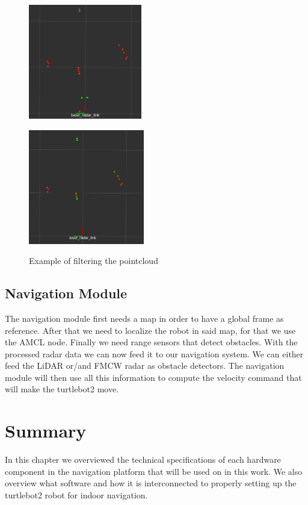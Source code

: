 \begin{figure}[ht!] 
    \begin{minipage}[b]{.49\linewidth}
        \includegraphics[height=5cm,width=\linewidth]{imgs/chapter4/notfilt.png}
        \label{fig:nonfilt}
    \end{minipage}
    \begin{minipage}[b]{.49\linewidth}
        \includegraphics[height=5cm,width=\linewidth]{imgs/chapter4/filt.png}
        \label{fig:filt}
    \end{minipage}
    \caption{Example of filtering the pointcloud}
    \label{fig:filters}
\end{figure}
\subsection{Navigation Module}
The navigation module first needs a map in order to have a global frame as reference. After that we need to localize the robot in said map, for that we use the \ac{AMCL} node. Finally we need range sensors that detect obstacles.
With the processed \ac{radar} data we can now feed it to our navigation system. We can either feed the \ac{LiDAR} or/and \ac{FMCW} \ac{radar} as obstacle detectors. 
The navigation module will then use all this information to compute the velocity command  that will make the turtlebot2 move.


\section{Summary}
In this chapter we overviewed the technical specifications of each hardware component in the navigation platform that will be used on in this work. We also overview what software and how it is interconnected  to properly setting up the turtlebot2 robot for indoor navigation.



